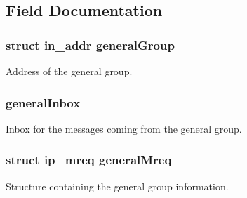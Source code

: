 \subsection{Field Documentation}
\subsubsection[{\texorpdfstring{general\+Group}{generalGroup}}]{\setlength{\rightskip}{0pt plus 5cm}struct in\+\_\+addr general\+Group}\hypertarget{struct_m_c_m__server_stats_ae0a7d909c0b83a8ced5716965c5b6610}{}\label{struct_m_c_m__server_stats_ae0a7d909c0b83a8ced5716965c5b6610}


Address of the general group. 

\subsubsection[{\texorpdfstring{general\+Inbox}{generalInbox}}]{ general\+Inbox}\hypertarget{struct_m_c_m__server_stats_ab4c84972cf4441c1f4342075f6a51607}{}\label{struct_m_c_m__server_stats_ab4c84972cf4441c1f4342075f6a51607}


Inbox for the messages coming from the general group. 

\subsubsection[{\texorpdfstring{general\+Mreq}{generalMreq}}]{\setlength{\rightskip}{0pt plus 5cm}struct ip\+\_\+mreq general\+Mreq}\hypertarget{struct_m_c_m__server_stats_a4b8f1676ba2e5909c95e2c4eb4b0658b}{}\label{struct_m_c_m__server_stats_a4b8f1676ba2e5909c95e2c4eb4b0658b}


Structure containing the general group information. 

